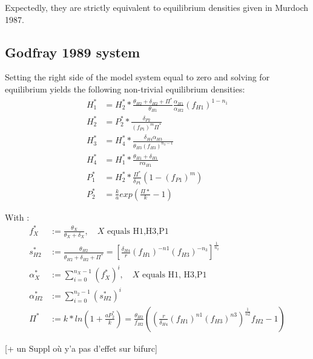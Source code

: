 \documentclass[12pt,a4paper,onecolumn]{article}
\begin{document}
Expectedly, they are strictly equivalent to equilibrium densities given in Murdoch 1987.

\subsection{Godfray 1989 system}

Setting the right side of the model system equal to zero and solving for equilibrium yields the following non-trivial equilibrium densities:
 \begin{align}
  H_1^* &= H_2^* * \frac{\theta_{H2}+\delta_{H2}+\Pi^*}{\theta_{H1}} \frac{\alpha_{H1}}{\alpha_{H2}} (f_{H1})^{1-n_1} \nonumber \\
  H_2^* &= P_2^* * \frac{\delta_{P2}}{(f_{P1})^{m} \Pi^*} \nonumber \\
  H_3^* &= H_4^* * \frac{\delta_{H4} \alpha_{H3}}{\theta_{H3}(f_{H3})^{n_3-1}}  \nonumber \\
  H_4^* &= H_1^* * \frac{\theta_{H1}+\delta_{H1}}{r \alpha_{H1}}  \\
  P_1^* &= H_2^* * \frac{\Pi^*}{\delta_{P1}}(1-(f_{P1})^{m}) \nonumber \\
  P_2^* &= \frac{k}{a}exp(\frac{\Pi*}{k}-1) \nonumber 
\end{align}

With :
 \begin{align}
  f_X^* &:= \frac{\theta_X}{\theta_X + \delta_X}, \quad \text{$X$ equals H1,H3,P1} \nonumber \\
  s_{H2}^* &:= \frac{\theta_{H2}}{\theta_{H2} + \delta_{H2} + \Pi^*} = [\frac{\delta_{H4}}{r}(f_{H1})^{-n1}(f_{H3})^{-n_3}]^{\frac{1}{n_2}}\nonumber \\
  \alpha_X^* &:= \sum_{i=0}^{n_X-1} (f_X^*)^i,  \quad \text{$X$ equals H1, H3,P1} \\
  \alpha_{H2}^* &:= \sum_{i=0}^{n_2-1} (s_{H2}^*)^i \nonumber \\
  \Pi^* &:= k*ln(1+\frac{aP_2^*}{k}) = \frac{\theta_{H2}}{f_{H2}} ((\frac{r}{\delta_{H4}}(f_{H1})^{n1}(f_{H3})^{n3})^{\frac{1}{n2}}f_{H2} -1)\nonumber 
 \end{align}

[+ un Suppl où y'a pas d'effet sur bifurc]
\end{document}
